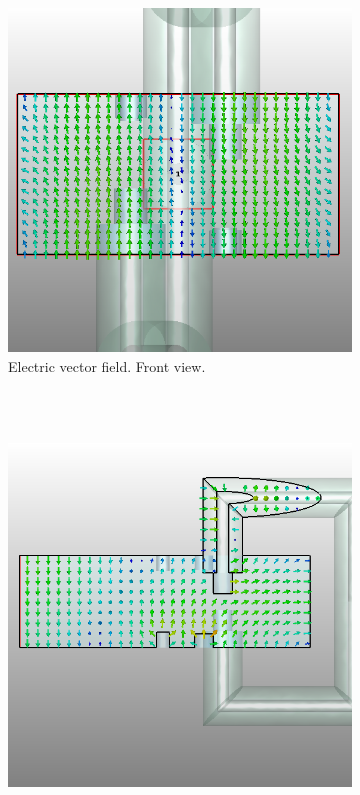 \documentclass[english,twoside]{article}
\begin{document}
\begin{landscape}
\begin{figure}
\begin{subfigure}[b]{0.4\textwidth}
					\includegraphics[width=\textwidth]{figures/coaxToWrTE20_screw_front}
					\caption{Electric vector field. Front view.}
				\end{subfigure}
				\vspace{10pt}\\
				~
				\begin{subfigure}[b]{0.4\textwidth}
					\includegraphics[width=\textwidth]{figures/coaxToWrTE20_screw_lateral1}

\end{subfigure}
\end{figure}
\end{landscape}
\end{document}
